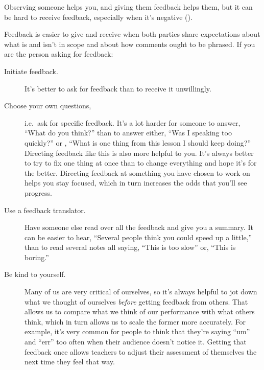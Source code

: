 
Observing someone helps you,
and giving them feedback helps them,
but it can be hard to receive feedback,
especially when it's negative ().


Feedback is easier to give and receive when both parties share expectations
about what is and isn't in scope
and about how comments ought to be phrased.
If you are the person asking for feedback:

\begin{description}

\item[Initiate feedback.]
  It's better to ask for feedback than to receive it unwillingly.

\item[Choose your own questions,]
  i.e.\ ask for specific feedback.
  It's a lot harder for someone to answer,
  ``What do you think?''
  than to answer either,
  ``Was I speaking too quickly?''
  or ,
  ``What is one thing from this lesson I should keep doing?''
  Directing feedback like this is also more helpful to you.
  It's always better to try to fix one thing at once
  than to change everything and hope it's for the better.
  Directing feedback at something you have chosen to work on helps you stay focused,
  which in turn increases the odds that you'll see progress.

\item[Use a feedback translator.]
  Have someone else read over all the feedback and give you a summary.
  It can be easier to hear,
  ``Several people think you could speed up a little,''
  than to read several notes all saying, ``This is too slow''
  or, ``This is boring.''

\item[Be kind to yourself.]
  Many of us are very critical of ourselves,
  so it's always helpful to jot down what we thought of ourselves
  \emph{before} getting feedback from others.
  That allows us to compare what we think of our performance
  with what others think,
  which in turn allows us to scale the former more accurately.
  For example,
  it's very common for people to think that they're saying ``um'' and ``err'' too often
  when their audience doesn't notice it.
  Getting that feedback once allows teachers to adjust their assessment of themselves
  the next time they feel that way.

\end{description}

